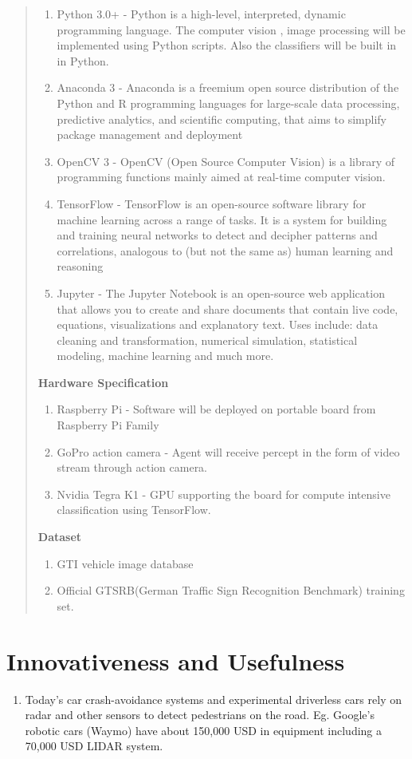 \documentclass[12pt,a4paper,final]{article}
\begin{document}
\begin{flushleft}
\begin{quotation}
\begin{enumerate}
\item
Python 3.0+ - Python is a high-level, interpreted, dynamic programming language. The computer vision , image processing will be implemented using Python scripts. Also the classifiers will be built in in Python.
\item 
Anaconda 3 - Anaconda is a freemium open source distribution of the Python and R programming languages for large-scale data processing, predictive analytics, and scientific computing, that aims to simplify package management and deployment
\item
OpenCV 3 - OpenCV (Open Source Computer Vision) is a library of programming functions mainly aimed at real-time computer vision.
\item
TensorFlow - TensorFlow is an open-source software library for machine learning across a range of tasks. It is a system for building and training neural networks to detect and decipher patterns and correlations, analogous to (but not the same as) human learning and reasoning
\item
Jupyter - The Jupyter Notebook is an open-source web application that allows you to create and share documents that contain live code, equations, visualizations and explanatory text. Uses include: data cleaning and transformation, numerical simulation, statistical modeling, machine learning and much more.


\end{enumerate}

\textbf{Hardware Specification}
\begin{enumerate}
\item
Raspberry Pi - Software will be deployed on portable board from Raspberry Pi Family
\item
GoPro action camera - Agent will receive percept in the form of video stream through action camera.
\item
Nvidia Tegra K1  - GPU supporting the board for compute intensive classification using TensorFlow.
\end{enumerate}

\textbf{Dataset}
\begin{enumerate}
\item
GTI vehicle image database
\item
Official GTSRB(German Traffic Sign Recognition Benchmark) training set.
\end{enumerate}
\end{quotation}
\pagebreak
\noindent
\section{Innovativeness and Usefulness}
\begin{enumerate}
\item
	Today’s car crash-avoidance systems and experimental driverless cars rely on radar and other sensors to detect pedestrians on the road. Eg. Google's robotic cars (Waymo) have about 150,000 USD in equipment including a 70,000 USD LIDAR system.


\end{enumerate}
\end{flushleft}
\end{document}
